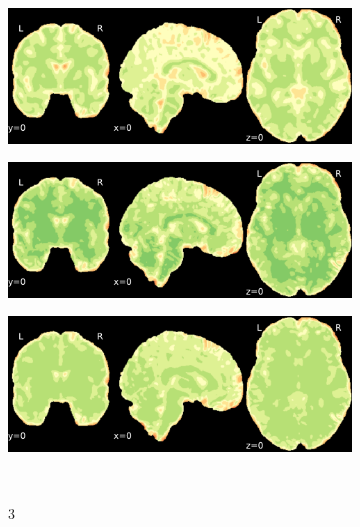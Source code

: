 \documentclass{article}
\begin{document}
\begin{landscape}
\begin{figure}
\begin{subfigure}[t]{0.2\paperheight}
        \end{subfigure}
        \begin{subfigure}[t]{0.2\paperheight}
            \centering
            \includegraphics[width=\textwidth]{figures/sig/fwhm_5/rr_ds001771_sub-36_sig.pdf}
        \end{subfigure}
        \begin{subfigure}[t]{0.2\paperheight}
            \centering
            \includegraphics[width=\textwidth]{figures/sig/fwhm_5/rs_ds001771_sub-36_sig.pdf}
        \end{subfigure}
        \begin{subfigure}[t]{0.2\paperheight}
            \centering
            \includegraphics[width=\textwidth]{figures/sig/fwhm_5/rr.rs_ds001771_sub-36_sig.pdf}
        \end{subfigure} \\
        \begin{subfigure}[b][][c]{0.01\paperwidth} 3 \vspace*{15pt} \end{subfigure}

\end{figure}
\end{landscape}
\end{document}
